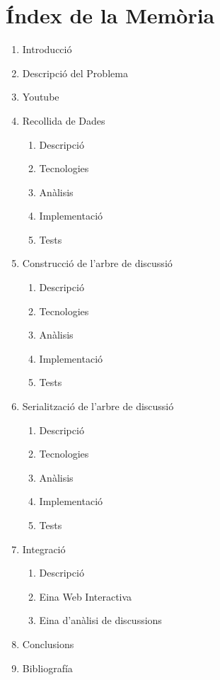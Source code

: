 \documentclass{article}
\begin{document}
	\section{Índex de la Memòria}
	\renewcommand{\labelenumii}{\Roman{enumii}}	
	\begin{enumerate}
		\item Introducció
		\item Descripció del Problema
		\item Youtube
		\item Recollida de Dades
		\begin{enumerate}
			\item Descripció
			\item Tecnologies
			\item Anàlisis
			\item Implementació
			\item Tests
		\end{enumerate}
		\item Construcció de l'arbre de discussió
		\begin{enumerate}
			\item Descripció
			\item Tecnologies
			\item Anàlisis
			\item Implementació
			\item Tests
		\end{enumerate}
		\item Serialització de l'arbre de discussió
		\begin{enumerate}
			\item Descripció
			\item Tecnologies
			\item Anàlisis
			\item Implementació
			\item Tests
		\end{enumerate}
		\item Integració
		\begin{enumerate}
			\item Descripció
			\item Eina Web Interactiva
			\item Eina d'anàlisi de discussions
		\end{enumerate}
		\item Conclusions
		\item Bibliografía
	\end{enumerate}
\end{document}
